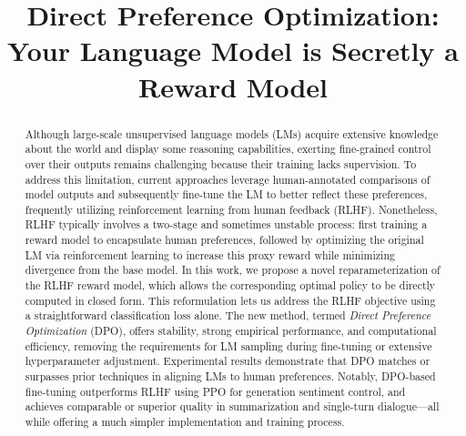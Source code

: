 \title{Direct Preference Optimization: Your Language Model is Secretly a Reward Model}

\begin{abstract}
Although large-scale unsupervised language models (LMs) acquire extensive knowledge about the world and display some reasoning capabilities, exerting fine-grained control over their outputs remains challenging because their training lacks supervision. To address this limitation, current approaches leverage human-annotated comparisons of model outputs and subsequently fine-tune the LM to better reflect these preferences, frequently utilizing reinforcement learning from human feedback (RLHF). Nonetheless, RLHF typically involves a two-stage and sometimes unstable process: first training a reward model to encapsulate human preferences, followed by optimizing the original LM via reinforcement learning to increase this proxy reward while minimizing divergence from the base model. In this work, we propose a novel reparameterization of the RLHF reward model, which allows the corresponding optimal policy to be directly computed in closed form. This reformulation lets us address the RLHF objective using a straightforward classification loss alone. The new method, termed \textit{Direct Preference Optimization} (DPO), offers stability, strong empirical performance, and computational efficiency, removing the requirements for LM sampling during fine-tuning or extensive hyperparameter adjustment. Experimental results demonstrate that DPO matches or surpasses prior techniques in aligning LMs to human preferences. Notably, DPO-based fine-tuning outperforms RLHF using PPO for generation sentiment control, and achieves comparable or superior quality in summarization and single-turn dialogue—all while offering a much simpler implementation and training process.
\end{abstract}

